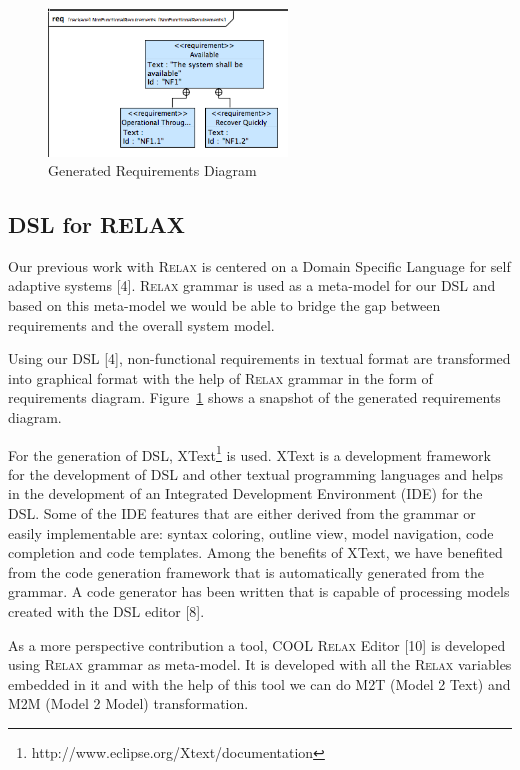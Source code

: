 \documentclass[10pt, conference, compsocconf]{IEEEtran}
\def\myrelax{\textsc{Relax}}                  %
\newcommand{\Myfig}[1]{Figure~\ref{fig:#1}}
\begin{document}
\begin{figure}[!t]
\centering
\includegraphics[width=2.5in]{fig4}
\caption{Generated Requirements Diagram}
\label{fig:reqdiag}
\end{figure}

\subsection{DSL for RELAX}

Our previous work with \myrelax{} is centered on a Domain Specific Language for self adaptive systems [4]. \myrelax{} grammar is used as a meta-model for our DSL and based on this meta-model we would be able to bridge the gap between requirements and the overall system model. 

Using our DSL [4], non-functional requirements in textual format are transformed into graphical format with the help of \myrelax{} grammar in the form of requirements diagram. \Myfig{reqdiag} shows a snapshot of the generated requirements diagram.  

For the generation of DSL, XText\footnote{http://www.eclipse.org/Xtext/documentation} is used. XText is a development framework for the development of DSL and other textual programming languages and helps in the development of an  Integrated Development Environment (IDE) for the DSL. Some of the IDE features that are either derived from the grammar or easily implementable are: syntax coloring, outline view, model navigation, code completion and code templates. Among the benefits of XText, we have benefited from the code generation framework that is automatically generated from the grammar. A code generator has been written that is capable of processing models created with the DSL editor [8]. 

As a more perspective contribution a tool, COOL \myrelax{} Editor [10] is developed using \myrelax{} grammar as meta-model. It is developed with all the \myrelax{} variables embedded in it and with the help of this tool we can do M2T (Model 2 Text) and M2M (Model 2 Model) transformation. 
\end{document}
